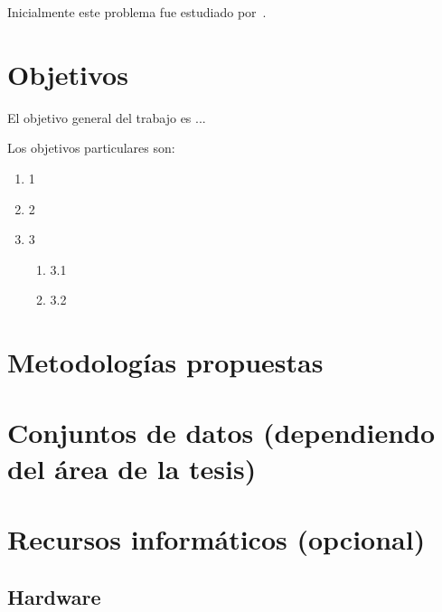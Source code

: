 \documentclass[12pt]{article}
\begin{document}
Inicialmente este problema fue estudiado por~\cite{knuth2014art}.

\bigskip


\section{Objetivos}

El objetivo general del trabajo es ...

Los objetivos particulares son:

\begin{enumerate}
    \item 1
    \item 2
    \item 3
    \begin{enumerate}
        \item 3.1
        \item 3.2
    \end{enumerate}
\end{enumerate}

\bigskip


\section{Metodologías propuestas}

\bigskip


\section{Conjuntos de datos (dependiendo del área de la tesis)}

\bigskip


\section{Recursos informáticos (opcional)}

\subsection{Hardware}
\end{document}
